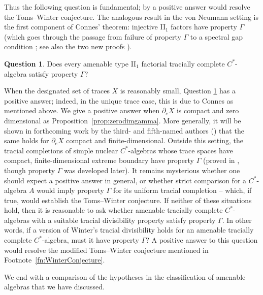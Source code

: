 \documentclass[a4paper,11pt]{amsart}
\theoremstyle{definition}
\newtheorem{question}[theorem]{Question}
\numberwithin{equation}{section}
\numberwithin{theorem}{section}
\begin{document}
Thus the following question is fundamental; by \cite[Theorem 5.6]{CETW} a positive answer would resolve the Toms--Winter conjecture. The analogous result in the von Neumann setting is the first component of Connes' theorem: injective II$_1$ factors have property $\Gamma$ (which goes through the passage from failure of property $\Gamma$ to a spectral gap condition \cite[Corollary 2.2]{Co76}; see also the two new proofs \cite{Ma17,Ma23}).

\begin{question}\label{Q:semidiscreteGamma}
	Does every amenable type II$_1$ factorial tracially complete $C^*$-algebra satisfy property $\Gamma$?
\end{question} 

When the designated set of traces $X$ is reasonably small, Question \ref{Q:semidiscreteGamma} has a positive answer; indeed, in the unique trace case, this is due to Connes as mentioned above. We give a positive answer when $\partial_eX$ is compact and zero dimensional as Proposition~\ref{prop:zerodimgamma}. More generally, it will be shown in forthcoming work by the third- and fifth-named authors (\cite{EvingtonSchafhauser}) that the same holds for $\partial_eX$ compact and finite-dimensional.  Outside this setting, the tracial completions of simple nuclear $C^*$-algebras whose trace spaces have compact, finite-dimensional extreme boundary have property $\Gamma$ (proved in \cite{KR14,TWW15,Sa12}, though property $\Gamma$ was developed later). It remains mysterious whether one should expect a positive answer in general, or whether strict comparison for a $C^*$-algebra $A$ would imply property $\Gamma$ for its uniform tracial completion -- which, if true, would establish the Toms--Winter conjecture.  If neither of these situations hold, then it is reasonable to ask whether amenable tracially complete $C^*$-algebras with a suitable tracial divisibility property satisfy property $\Gamma$. In other words, if a version of Winter's tracial divisibility holds for an amenable tracially complete $C^*$-algebra, must it have property $\Gamma$? A positive answer to this question would resolve the modified Toms--Winter conjecture mentioned in Footnote~\ref{fn:WinterConjecture}. 







We end with a comparison of the hypotheses in the classification of amenable algebras that we have discussed.

\
\end{document}
